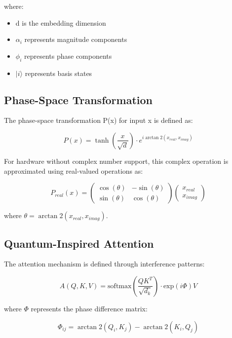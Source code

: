 \documentclass[twocolumn]{article}
\begin{document}
where:
\begin{itemize}
    \item d is the embedding dimension
    \item $\alpha_i$ represents magnitude components
    \item $\phi_i$ represents phase components
    \item $|i\rangle$ represents basis states
\end{itemize}

\subsection{Phase-Space Transformation}
The phase-space transformation P(x) for input x is defined as:

\begin{equation}
P(x) = \tanh(\frac{x}{\sqrt{d}}) \cdot e^{i\arctan2(x_{real}, x_{imag})}
\end{equation}

For hardware without complex number support, this complex operation is approximated using real-valued operations as:

\begin{equation}
P_{real}(x) = \begin{pmatrix} 
\cos(\theta) & -\sin(\theta) \\
\sin(\theta) & \cos(\theta)
\end{pmatrix} \begin{pmatrix}
x_{real} \\
x_{imag}
\end{pmatrix}
\end{equation}

where $\theta = \arctan2(x_{real}, x_{imag})$.

\subsection{Quantum-Inspired Attention}
The attention mechanism is defined through interference patterns:

\begin{equation}
A(Q,K,V) = \text{softmax}(\frac{QK^T}{\sqrt{d_k}}) \cdot \text{exp}(i\Phi)V
\end{equation}

where $\Phi$ represents the phase difference matrix:

\begin{equation}
\Phi_{ij} = \arctan2(Q_i, K_j) - \arctan2(K_i, Q_j)
\end{equation}
\end{document}

